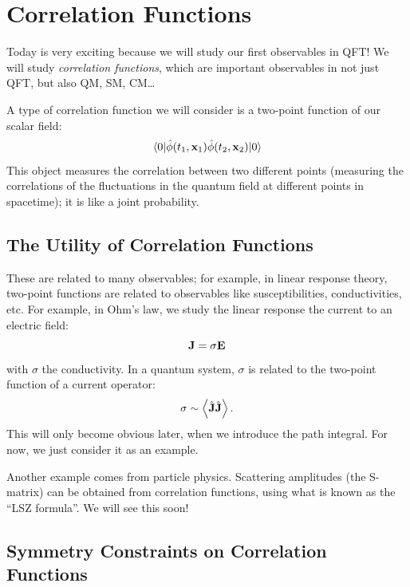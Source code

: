 \section{Correlation Functions}
Today is very exciting because we will study our first observables in QFT! We will study \emph{correlation functions}, which are important observables in not just QFT, but also QM, SM, CM\ldots

A type of correlation function we will consider is a two-point function of our scalar field:
\begin{equation}
    \langle 0 \rvert\hat{\phi}(t_1, \mathbf{x}_1)\hat{\phi}(t_2, \mathbf{x}_2)\lvert 0 \rangle
\end{equation}
This object measures the correlation between two different points (measuring the correlations of the fluctuations in the quantum field at different points in spacetime); it is like a joint probability.

\subsection{The Utility of Correlation Functions}
These are related to many observables; for example, in linear response theory, two-point functions are related to observables like susceptibilities, conductivities, etc. For example, in Ohm's law, we study the linear response the current to an electric field:
\begin{equation}
    \mathbf{J} = \sigma\mathbf{E}
\end{equation}
with $\sigma$ the conductivity. In a quantum system, $\sigma$ is related to the two-point function of a current operator:
\begin{equation}
    \sigma \sim \left< \hat{\mathbf{J}}\hat{\mathbf{J}} \right>.
\end{equation}
This will only become obvious later, when we introduce the path integral. For now, we just consider it as an example.

Another example comes from particle physics. Scattering amplitudes (the S-matrix) can be obtained from correlation functions, using what is known as the ``LSZ formula''. We will see this soon!

\subsection{Symmetry Constraints on Correlation Functions}
